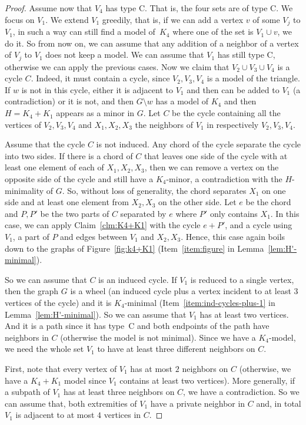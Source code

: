 \documentclass[a4paper,thm-restate,USenglish]{lipics-v2019}
\begin{document}
\begin{proof}
Assume now that $V_4$ has type C. That is, the four sets are of type C. 
We focus on $V_1$. 
We extend $V_1$ greedily, that is, if we can add a vertex $v$ of some $V_j$ to $V_1$, in such a way can still find a model of~$K_4$ where one of the set is $V_1 \cup v$, we do it. 
So from now on, we can assume that any addition of a neighbor of a vertex of $V_j$ to $V_1$ does not keep a model. 
We can assume that $V_1$ has still type C, otherwise we can apply the previous cases. 
Now we claim that $V_2 \cup V_3 \cup V_4$ is a cycle $C$. Indeed, it must contain a cycle, since $V_2,V_3,V_4$ is a model of the triangle. If $w$ is not in this cycle, either it is adjacent to $V_1$ and then can be added to $V_1$ (a contradiction) or it is not, and then $G \setminus w$ has a model of $K_4$ and then $H=K_4+K_1$ appears as a minor in $G$.
Let $C$ be the cycle containing all the vertices of $V_2,V_3,V_4$ and $X_1,X_2,X_3$ the neighbors of $V_1$ in respectively $V_2,V_3,V_4$.

Assume that the cycle $C$ is not induced.
Any chord of the cycle separate the cycle into two sides. 
If there is a chord of $C$ that leaves one side of the cycle with at least one element of each of $X_1,X_2,X_3$, then we can remove a vertex on the opposite side of the cycle and still have a $K_4$-minor, a contradiction with the $H$-minimality of $G$. 
So, without loss of generality, the chord separates $X_1$ on one side and at least one element from $X_2,X_3$ on the other side. Let $e$ be the chord and $P,P'$ be the two parts of $C$ separated by $e$ where $P'$ only contains $X_1$.
In this case, we can apply Claim~\ref{clm:K4+K1} with the cycle $e+P'$, and a cycle  using $V_1$, a part of $P$ and edges between $V_1$ and $X_2,X_3$. Hence, this case again boils down to the graphs of Figure~\ref{fig:k4+K1} (Item~\ref{item:figure} in Lemma~\ref{lem:H'-minimal}). 

So we can assume that $C$ is an induced cycle. If $V_1$ is reduced to a single vertex, then the graph $G$ is a wheel (an induced cycle plus a vertex incident to at least $3$ vertices of the cycle) and it is $K_4$-minimal (Item~\ref{item:ind-cycles-plus-1} in Lemma~\ref{lem:H'-minimal}). 
So we can assume that $V_1$ has at least two vertices. And it is a path since it has type~C and both endpoints of the path have neighbors in $C$ (otherwise the model is not minimal).  
Since we have a $K_4$-model, we need the whole set $V_1$ to have at least three different neighbors on $C$. 

First, note that every vertex of $V_1$ has at most $2$ neighbors on $C$ (otherwise, we have a $K_4+K_1$ model since $V_1$ contains at least two vertices). More generally, if a subpath of $V_1$ has at least three neighbors on $C$, we have a contradiction. So we can assume that, both extremities of $V_1$ have a private neighbor in $C$ and, in total $V_1$ is adjacent to at most $4$ vertices in $C$.


\end{proof}
\end{document}

